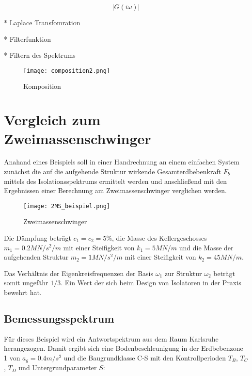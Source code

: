 \begin{equation} \label{laplace-attan}
|G(i\omega)|
\end{equation}

* Laplace Transfomration

* Filterfunktion

* Filtern des Spektrums

\begin{figure}[ht]
    \centering
    \texttt{[image: composition2.png]}
    \caption{Komposition}
    \label{fig:composition}
\end{figure}


\pagebreak

\section{Vergleich zum Zweimassenschwinger}
\label{sec:vergleich}

Anahand eines Beispiels soll in einer Handrechnung an einem einfachen System zunächst die auf die aufgehende Struktur wirkende Gesamterdbebenkraft $F_b$ mittels des Isolationsspektrums ermittelt werden und anschließend mit den Ergebnissen einer Berechnung am Zweimassenschwinger verglichen werden.

\begin{figure}[ht]
    \centering
    \texttt{[image: 2MS\_beispiel.png]}
    \caption{Zweimassenschwinger}
    \label{fig:2ms}
\end{figure}

Die Dämpfung beträgt $c_1 = c_2 = 5\%$, die Masse des Kellergeschosses $m_1 = 0.2 MN/s^2/m$ mit einer Steifigkeit von $k_1 = 5 MN/m$ und die Masse der aufgehenden Struktur $m_2 = 1 MN/s^2/m$ mit einer Steifigkeit von $k_2 = 45 MN/m$.

Das Verhältnis der Eigenkreisfrequenzen der Basis $\omega_1$ zur Struktur $\omega_2$ beträgt somit ungefähr $1/3$. Ein Wert der sich beim Design von Isolatoren in der Praxis bewehrt hat.

\subsection{Bemessungsspektrum}

Für dieses Beispiel wird ein Antwortspektrum aus dem Raum Karlsruhe herangezogen. Damit ergibt sich eine Bodenbeschleunigung in der Erdbebenzone 1 von $a_g = 0.4 m/s^2$ und die Baugrundklasse C-S mit den Kontrollperioden $T_B$, $T_C$, $T_D$ und Untergrundparameter $S$:

